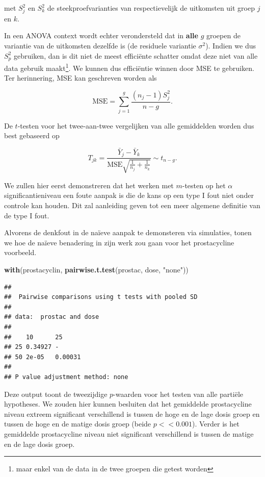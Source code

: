 \documentclass[
  12pt,dutch]{book}
\newenvironment{Shaded}{\begin{snugshade}}{\end{snugshade}}
\newcommand{\FunctionTok}[1]{\textcolor[rgb]{0.13,0.29,0.53}{\textbf{#1}}}
\newcommand{\NormalTok}[1]{#1}
\newcommand{\StringTok}[1]{\textcolor[rgb]{0.31,0.60,0.02}{#1}}
\newcounter{none} %
\theoremstyle{definition}
\theoremstyle{definition}
\theoremstyle{definition}
\theoremstyle{definition}
\theoremstyle{remark}
\begin{document}
met \(S_j^2\) en \(S_k^2\) de steekproefvarianties van respectievelijk de uitkomsten uit groep \(j\) en \(k\).

In een ANOVA context wordt echter verondersteld dat in \textbf{alle} \(g\) groepen de variantie van de uitkomsten dezelfde is (de residuele variantie \(\sigma^2\)). Indien we dus \(S_p^2\) gebruiken, dan is dit niet de meest efficiënte schatter omdat deze niet van alle data gebruik maakt\footnote{maar enkel van de data in de twee groepen die getest worden}. We kunnen dus efficiëntie winnen door MSE te gebruiken. Ter herinnering, MSE kan geschreven worden als

\[\text{MSE}= \sum_{j=1}^g \frac{(n_j-1)S_j^2}{n-g}.\]

De \(t\)-testen voor het twee-aan-twee vergelijken van alle gemiddelden worden dus best gebaseerd op

\[T_{jk} = \frac{\bar{Y}_j-\bar{Y}_k}{\text{MSE}\sqrt{\frac{1}{n_j}+\frac{1}{n_k}}} \sim t_{n-g}.\]

We zullen hier eerst demonstreren dat het werken met \(m\)-testen op het \(\alpha\) significantieniveau een foute aanpak is die de kans op een type I fout niet onder controle kan houden. Dit zal aanleiding geven tot een meer algemene definitie van de type I fout.

Alvorens de denkfout in de naïeve aanpak te demonsteren via simulaties, tonen we hoe de naïeve benadering in zijn werk zou gaan voor het prostacycline voorbeeld.

\begin{Shaded}
\begin{Highlighting}[]
\FunctionTok{with}\NormalTok{(prostacyclin, }\FunctionTok{pairwise.t.test}\NormalTok{(prostac, dose, }\StringTok{"none"}\NormalTok{))}
\end{Highlighting}
\end{Shaded}

\begin{verbatim}
## 
##  Pairwise comparisons using t tests with pooled SD 
## 
## data:  prostac and dose 
## 
##    10      25     
## 25 0.34927 -      
## 50 2e-05   0.00031
## 
## P value adjustment method: none
\end{verbatim}

Deze output toont de tweezijdige \(p\)-waarden voor het testen van alle partiële hypotheses.
We zouden hier kunnen besluiten dat het gemiddelde prostacycline niveau extreem significant verschillend is tussen de hoge en de lage dosis groep en tussen de hoge en de matige dosis groep (beide \(p<<0.001\)).
Verder is het gemiddelde prostacycline niveau niet significant verschillend is tussen de matige en de lage dosis groep.
\end{document}
